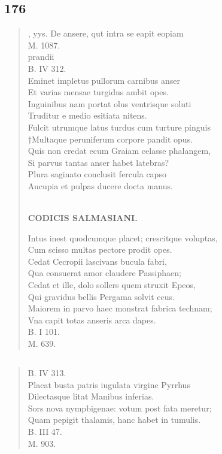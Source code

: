 \documentclass[11pt, a4paper]{report}
\begin{document}
            \subsection*{176}
      \begin{verse}
      , yys. De ansere, qut intra se eapit eopiam \\ M. 1087. \\ prandii \\ B. IV 312. \\ Eminet impletus pullorum carnibus anser \\ Et varias mensae turgidus ambit opes. \\ Inguinibus nam portat olus ventrisque soluti \\ Truditur e medio esitiata nitens. \\ Fulcit utrumque latus turdus cum turture pinguis \\ †Multaque peruniferum corpore pandit opus. \\ Quis non credat ecum Graiam celasse phalangem, \\ Si parvus tantas anser habet latebras? \\ Plura saginato conclusit fercula capso \\ Aucupia et pulpas ducere docta manus. \\ 
        ﻿\pagebreak 
    \begin{center} \textbf{CODICIS SALMASIANI.} \end{center} \marginpar{[153]} Intus inest quodcumque placet; crescitque voluptas, \\ Cum scisso multas pectore prodit opes. \\ Cedat Cecropii lascivans bucula fabri, \\ Qua consuerat amor claudere Passiphaen; \\ Cedat et ille, dolo sollers quem struxit Epeos, \\ Qui gravidus bellis Pergama solvit ecus. \\ Maiorem in parvo haec monstrat fabrica technam; \\ Vna capit totas anseris arca dapes. \\ B. I 101. \\ M. 639. \\ 
      \end{verse}
  
            \subsection*{}
      \begin{verse}
      B. IV 313. \\ Placat busta patris iugulata virgine Pyrrhus \\ Dilectasque litat Manibus inferias. \\ Sors nova nympbigenae: votum post fata meretur; \\ Quam pepigit thalamis, hanc habet in tumulis. \\ B. III 47. \\ M. 903. \\ 
      \end{verse}
  
\end{document}
